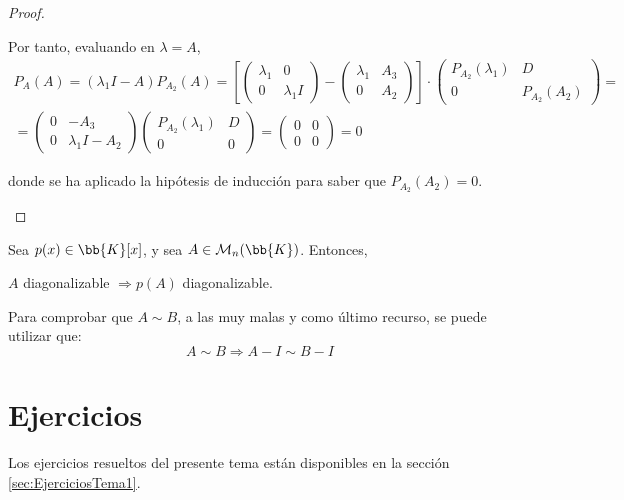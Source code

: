 \begin{proof}
\begin{itemize}
        Por tanto, evaluando en $\lambda = A$,
        \begin{multline*}
            P_{A}(A) =
            (\lambda_1 I - A)P_{A_2}(A)
            = \left[ \left(\begin{array}{c|c}
                \lambda_1 & 0 \\ \hline
                0 & \lambda_1 I
            \end{array}\right) - \left(\begin{array}{c|c}
                \lambda_1 & A_3 \\ \hline
                0 & A_2
            \end{array}\right)
            \right] \cdot 
            \left(\begin{array}{c|c}
                P_{A_2}(\lambda_1) & D \\ \hline
                0 & P_{A_2}(A_2)
            \end{array}\right) = \\
            = \left(\begin{array}{c|c}
                0 & -A_3 \\ \hline
                0 & \lambda_1 I - A_2
            \end{array}\right)
            \left(\begin{array}{c|c}
                P_{A_2}(\lambda_1) & D \\ \hline
                0 & 0
            \end{array}\right) = 
            \left(\begin{array}{c|c}
                0 & 0 \\ \hline
                0 & 0
            \end{array}\right) = 0
        \end{multline*}
        
        donde se ha aplicado la hipótesis de inducción para saber que $P_{A_2}(A_2) = 0$.\qedhere
    \end{itemize}
\end{proof}

\begin{prop}
    Sea $p(x)\in \bb{K}[x]$, y sea $A\in \mathcal{M}_n(\bb{K})$. Entonces,
    \begin{center}
        $A$ diagonalizable $\Longrightarrow p(A)$ diagonalizable.
    \end{center}
\end{prop}
\begin{observacion}
    Para comprobar que $A\sim B$, a las muy malas y como último recurso, se puede utilizar que:
    $$A\sim B \Longrightarrow A-I \sim B-I$$
\end{observacion}



\section{Ejercicios}
Los ejercicios resueltos del presente tema están disponibles en la sección \ref{sec:EjerciciosTema1}.